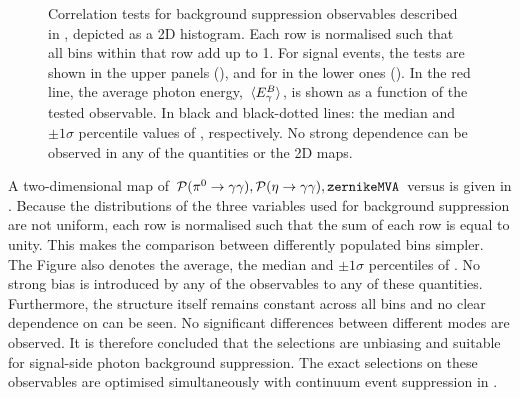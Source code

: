 \begin{figure}[htbp!]
{    }
    \caption{\label{fig:selection_correlations} Correlation tests for background suppression observables described in , depicted as a 2D histogram.
    Each row is normalised such that all bins within that row add up to 1.
    For signal \BptoXsgamma events, the tests are shown
    in the upper panels (),
    and for \BztoXsgamma in the lower ones ().
    In the red line, the average photon energy, $\expval**{{E^B_{\gamma}}}$, is shown as a function of the tested observable.
    In black and black-dotted lines: the median and $\pm 1 \sigma$ percentile values of \EB, respectively.
    No strong dependence can be observed in any of the quantities or the 2D maps.
    }
\end{figure}

A two-dimensional map of ${{\mathcal{P}(\pi^0\rightarrow\gamma\gamma)},{\mathcal{P}(\eta\rightarrow\gamma\gamma)},{\texttt{zernikeMVA}}}$ versus \EB is given in .
Because the distributions of the three variables used for background suppression are not uniform, each row is normalised such that the sum of each row is equal to unity.
This makes the comparison between differently populated bins simpler.
The Figure also denotes the average, the median and $\pm 1\sigma$ percentiles of \EB.
No strong bias is introduced by any of the observables to any of these quantities.
Furthermore, the structure itself remains constant across all bins and no clear dependence on \EB can be seen.
No significant differences between different \FEI modes are observed.
It is therefore concluded that the selections are unbiasing and suitable for signal-side photon background suppression.
The exact selections on these observables are optimised simultaneously with continuum event suppression in .
